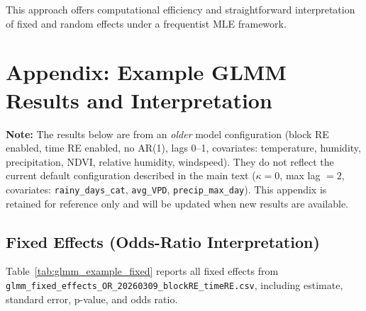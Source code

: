 \documentclass[12pt,a4paper]{article}
\begin{document}
This approach offers computational efficiency and straightforward interpretation of fixed and random effects under a frequentist MLE framework.

\appendix
\section{Appendix: Example GLMM Results and Interpretation}

\textbf{Note:} The results below are from an \emph{older} model configuration (block RE enabled, time RE enabled, no AR(1), lags 0--1, covariates: temperature, humidity, precipitation, NDVI, relative humidity, windspeed).
They do not reflect the current default configuration described in the main text ($\kappa = 0$, max lag $= 2$, covariates: \texttt{rainy\_days\_cat}, \texttt{avg\_VPD}, \texttt{precip\_max\_day}).
This appendix is retained for reference only and will be updated when new results are available.

\subsection{Fixed Effects (Odds-Ratio Interpretation)}

Table~\ref{tab:glmm_example_fixed} reports all fixed effects from \texttt{glmm\_fixed\_effects\_OR\_20260309\_blockRE\_timeRE.csv}, including estimate, standard error, p-value, and odds ratio.
\end{document}
